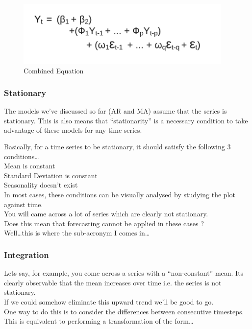 \documentclass[12pt]{report}
\begin{document}
\begin{figure}[H]%
  \begin {center}
  \includegraphics[width=0.95\textwidth]{images/CombinedE.png}
  \caption{Combined Equation}
  \label{fig:ecg}
  \end {center}
\end{figure}

\subsubsection{Stationary}
The models we’ve discussed so far (AR and MA) assume that the series is stationary. This is also means that “stationarity” is a necessary condition to take advantage of these models for any time series.

Basically, for a time series to be stationary, it should satisfy the following 3 conditions…\\

Mean  is constant\\
Standard Deviation  is constant\\
Seasonality doesn’t exist\\


In most cases, these conditions can be visually analysed by studying the plot against time.\\

You will came across a lot of series which are clearly not stationary.\\
Does this mean that forecasting cannot be applied in these cases ?\\
Well…this is where the sub-acronym I comes in…


\subsubsection{Integration}
Lets say, for example, you come across a series with a “non-constant” mean. Its clearly observable that the mean increases over time i.e. the series is not stationary.\\

If we could somehow eliminate this upward trend we’ll be good to go.\\
One way to do this is to consider the differences between consecutive timesteps. This is equivalent to performing a transformation of the form…
\end{document}
